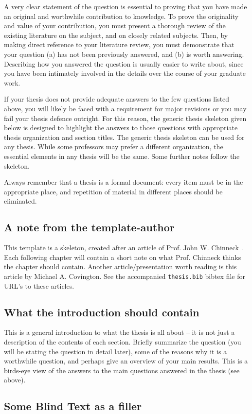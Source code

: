 A very clear statement of the question is essential to proving that you have
made an original and worthwhile contribution to knowledge. To prove the
originality and value of your contribution, you must present a thorough review
of the existing literature on the subject, and on closely related subjects.
Then, by making direct reference to your literature review, you must
demonstrate that your question (a) has not been previously answered, and (b)
is worth answering. Describing how you answered the question is usually easier
to write about, since you have been intimately involved in the details over
the course of your graduate work.

If your thesis does not provide adequate answers to the few questions listed
above, you will likely be faced with a requirement for major revisions or you
may fail your thesis defence outright. For this reason, the generic thesis
skeleton given below is designed to highlight the answers to those questions
with appropriate thesis organization and section titles. The generic thesis
skeleton can be used for any thesis. While some professors may prefer a
different organization, the essential elements in any thesis will be the same.
Some further notes follow the skeleton.

Always remember that a thesis is a formal document: every item must be in the
appropriate place, and repetition of material in different places should be
eliminated. 

\subsection{A note from the template-author}
This template is a skeleton, created after an article of Prof. John W.
Chinneck \cite{chinneck-thesis-howto}. Each following chapter will contain a short note on what Prof.
Chinneck thinks the chapter should contain. Another article/presentation worth
reading is this article by Michael A. Covington\cite{covington-write-think-learn}.
See the accompanied \texttt{thesis.bib} bibtex file for URL's to these
articles.

\subsection{What the introduction should contain}
This is a general introduction to what the thesis is all about -- it is not
just a description of the contents of each section. Briefly summarize the
question (you will be stating the question in detail later), some of the
reasons why it is a worthwhile question, and perhaps give an overview of your
main results. This is a birds-eye view of the answers to the main questions
answered in the thesis (see above).

\subsection{Some Blind Text as a filler}
\blindtext
\blindtext

